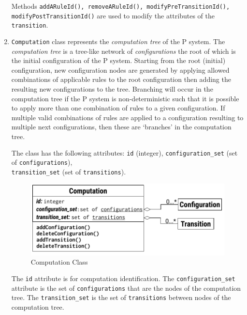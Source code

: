 \documentclass{article}
\begin{document}
\begin{enumerate}
Methods \texttt{addARuleId(), removeARuleId(), modifyPreTransitionId(), modifyPostTransitionId()}
are used to modify the attributes of the \texttt{transition}.


\item \texttt{Computation} class represents the \textit{computation tree} of the P system. The
\textit{computation tree} is a tree-like network of \textit{configurations} the root of which is the
initial configuration of the P system. Starting from the root (initial) configuration, new 
configuration nodes are generated by applying allowed combinations of applicable rules to the root 
configuration then adding the resulting new configurations to the tree. Branching will occur in the
computation tree if the P system is non-deterministic such that it is possible to apply more than
one combination of rules to a given configuration. If multiple valid combinations of rules are
applied to a configuration resulting to multiple next configurations, then these are `branches' in 
the computation tree.

The class has the following attributes: \texttt{id} (integer), \texttt{configuration\_set} (set of 
\texttt{configurations}), \\ \texttt{transition\_set} (set of \texttt{transitions}).

\begin{figure}[H]
\begin{center}
    \includegraphics[scale=0.8]{figures/zzz-computation.pdf}
    \caption{Computation Class}
    \label{fig:computation-class}
\end{center}
\end{figure}

The \texttt{id} attribute is for computation identification. The \texttt{configuration\_set}
attribute is the set of \texttt{configurations} that are the nodes of the computation tree. The
\texttt{transition\_set} is the set of \texttt{transitions} between nodes of the computation tree.


\end{enumerate}
\end{document}
